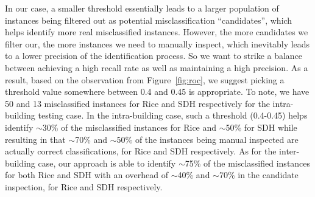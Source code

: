 In our case, a smaller threshold essentially leads to a larger population of instances being filtered out as potential misclassification ``candidates'', which helps identify more real 
misclassified instances. However, the more candidates we filter our, the more instances we need to manually inspect, which inevitably leads to a lower precision of the identification process. 
So we want to strike a balance between achieving a high recall rate as well as maintaining a high precision. As a result, based on the observation from Figure~\ref{fig:roc}, we suggest 
picking a threshold value somewhere between 0.4 and 0.45 is appropriate. To note, we have 50 and 13 misclassified instances for Rice and SDH respectively for the intra-building testing case. 
In the intra-building case, such a threshold (0.4-0.45) helps identify $\sim$30\% of the misclassified instances for Rice and $\sim$50\% for SDH while resulting in that $\sim$70\% and $\sim$50\% 
of the instances being manual inspected are actually correct classifications, for Rice and SDH respectively. As for the inter-building case, our approach is able to identify $\sim$75\% of the 
misclassified instances for both Rice and SDH with an overhead of $\sim$40\% and $\sim$70\% in the candidate inspection, for Rice and SDH respectively.

